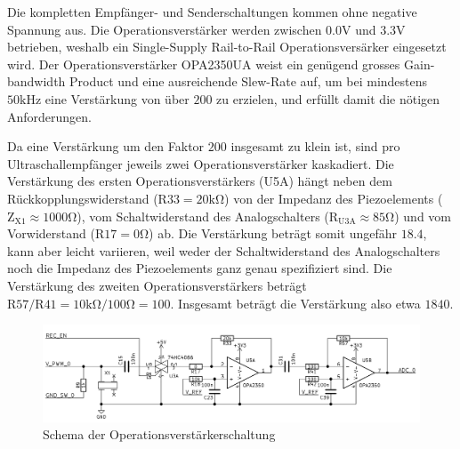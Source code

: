 Die kompletten Empfänger- und Senderschaltungen kommen ohne negative Spannung aus. Die Operationsverstärker werden zwischen $0.0 \mathrm{V}$ und $3.3 \mathrm{V}$ betrieben, weshalb ein Single-Supply Rail-to-Rail Operationsversärker eingesetzt wird. Der Operationsverstärker OPA2350UA weist ein genügend grosses Gain-bandwidth Product und eine ausreichende Slew-Rate auf, um bei mindestens $50 \mathrm{kHz}$ eine Verstärkung von über $200$ zu erzielen, und erfüllt damit die nötigen Anforderungen.

Da eine Verstärkung um den Faktor $200$ insgesamt zu klein ist, sind pro Ultraschallempfänger jeweils zwei Operationsverstärker kaskadiert. Die Verstärkung des ersten Operationsverstärkers (U5A) hängt neben dem Rückkopplungswiderstand ($\mathrm{R33} = 20 \mathrm{k \Omega}$) von der Impedanz des Piezoelements ($\mathrm{Z_{X1}} \approx 1000 \mathrm{\Omega}$), vom Schaltwiderstand des Analogschalters ($\mathrm{R_{U3A}} \approx 85 \mathrm{\Omega}$) und vom Vorwiderstand ($\mathrm{R17} = 0 \mathrm{\Omega}$) ab. Die Verstärkung beträgt somit ungefähr $18.4$, kann aber leicht variieren, weil weder der Schaltwiderstand des Analogschalters noch die Impedanz des Piezoelements ganz genau spezifiziert sind. Die Verstärkung des zweiten Operationsverstärkers beträgt $\mathrm{R57} / \mathrm{R41} = 10 \mathrm{k \Omega} / 100 \mathrm{\Omega} = 100$. Insgesamt beträgt die Verstärkung also etwa $1840$.

\begin{figure}[htb]
\begin{center}
\includegraphics[width=\textwidth]{graphics/image_hardware_opamp.png}
\end{center}
\caption{Schema der Operationsverstärkerschaltung} %
\label{fig:image_hardware_opamp}
\end{figure}
%

